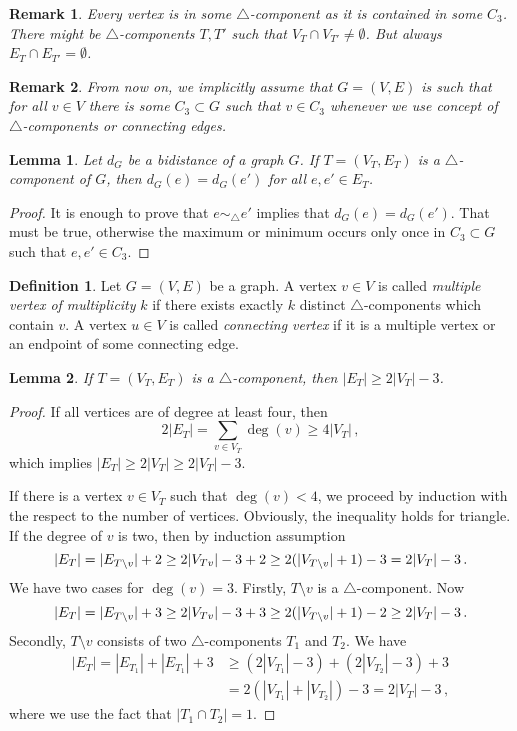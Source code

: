 \documentclass[a4paper, 11pt]{article}
\newcommand{\trcomp}{$\triangle$-component}
\newcommand{\trcomps}{$\triangle$-components}
\newtheorem{lem}{Lemma}[section]
\newtheorem*{rem}{Remark}
\theoremstyle{definition}
\newtheorem{defn}{Definition}[section]
\begin{document}
\begin{rem}
Every vertex is in some \trcomp{} as it is contained in some $C_3$. There might be \trcomps{} $T,T'$ such that $V_T \cap V_{T'}\neq \emptyset$. But always $E_T \cap E_{T'}= \emptyset$.
\end{rem}

\begin{rem}
From now on, we implicitly assume that $G=(V,E)$ is such that for all $v\in V$ there is some $C_3\subset G$ such that $v\in C_3$ whenever we use concept of \trcomps{} or connecting edges.
\end{rem}

\begin{lem}
\label{lem:bidistanceInTrcomp}
Let $d_G$ be a bidistance of a graph $G$. If $T=(V_T, E_T)$ is a \trcomp{} of $G$, then $d_G(e)=d_G(e')$ for all $e,e'\in E_T$.
\end{lem}
\begin{proof}
It is enough to prove that $e \sim_{\!\!\bigtriangleup} e'$ implies that $d_G(e)=d_G(e')$. That must be true, otherwise the maximum or minimum occurs only once in $C_3\subset G$ such that $e,e'\in C_3$.
\end{proof}





\begin{defn}
Let $G=(V,E)$ be a graph. A vertex $v\in V$ is called \emph{multiple vertex of multiplicity} $k$ if there exists exactly $k$ distinct \trcomps{} which contain $v$. A vertex $u\in V$ is called \emph{connecting vertex} if it is a multiple vertex or an endpoint of some connecting edge.
\end{defn}

\begin{lem}
If $T=(V_T, E_T)$ is a \trcomp{}, then $|E_T|\geq 2|V_T|-3$.
\label{lem:sizeTriangleComponent}
\end{lem}
\begin{proof}
If all vertices are of degree at least four, then $$2|E_T|=\sum_{v\in V_T} \deg(v) \geq 4|V_T|\,,$$ which implies $|E_T|\geq 2|V_T|\geq 2|V_T|-3$.

If there is a vertex $v\in V_T$ such that $\deg(v)<4$, we proceed by induction with the respect to the number of vertices. Obviously, the inequality holds for triangle. If the degree of $v$ is two, then by induction assumption
$$
|E_T|=|E_{T\setminus v}|+2\geq 2 |V_{T\\v}|-3 +2\geq 2 (|V_{T\setminus v}|+1)-3=2 |V_{T}|-3\,.
$$
We have two cases for $\deg(v)=3$. Firstly, $T\setminus v$ is a \trcomp{}. Now $$|E_T|=|E_{T\setminus v}|+3\geq 2 |V_{T\\v}|-3 +3\geq 2 (|V_{T\setminus v}|+1)-2\geq 2 |V_{T}|-3\,.$$ Secondly, $T\setminus v$ consists of two \trcomps{} $T_1$ and $T_2$. We have
\begin{align*}
|E_T|=|E_{T_1}|+|E_{T_1}|+3 &\geq (2 |V_{T_1}|-3)+(2 |V_{T_2}|-3) +3 \\
			&= 2(|V_{T_1}| +|V_{T_2}|)-3=2 |V_{T}|-3\,,
\end{align*}
where we use the fact that $|T_1 \cap T_2|=1$.
\end{proof}
\end{document}
